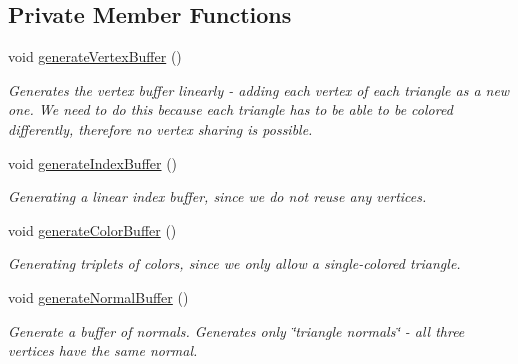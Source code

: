 \subsection*{Private Member Functions}
\begin{DoxyCompactItemize}
\item 
\mbox{\label{classpepr3d_1_1_geometry_a3c89c3e2f698d1cb25ad68767b90efc3}} 
void \mbox{\hyperlink{classpepr3d_1_1_geometry_a3c89c3e2f698d1cb25ad68767b90efc3}{generate\+Vertex\+Buffer}} ()
\begin{DoxyCompactList}\small\item\em Generates the vertex buffer linearly -\/ adding each vertex of each triangle as a new one. We need to do this because each triangle has to be able to be colored differently, therefore no vertex sharing is possible. \end{DoxyCompactList}\item 
\mbox{\label{classpepr3d_1_1_geometry_ac0ccbc4a83e4eeaa61fd3a7de4e0e7a9}} 
void \mbox{\hyperlink{classpepr3d_1_1_geometry_ac0ccbc4a83e4eeaa61fd3a7de4e0e7a9}{generate\+Index\+Buffer}} ()
\begin{DoxyCompactList}\small\item\em Generating a linear index buffer, since we do not reuse any vertices. \end{DoxyCompactList}\item 
\mbox{\label{classpepr3d_1_1_geometry_a93545e8dae1b2cfee74fbd8c7e203389}} 
void \mbox{\hyperlink{classpepr3d_1_1_geometry_a93545e8dae1b2cfee74fbd8c7e203389}{generate\+Color\+Buffer}} ()
\begin{DoxyCompactList}\small\item\em Generating triplets of colors, since we only allow a single-\/colored triangle. \end{DoxyCompactList}\item 
\mbox{\label{classpepr3d_1_1_geometry_a7d69aae6b0c09c7727d170af8b8b99b2}} 
void \mbox{\hyperlink{classpepr3d_1_1_geometry_a7d69aae6b0c09c7727d170af8b8b99b2}{generate\+Normal\+Buffer}} ()
\begin{DoxyCompactList}\small\item\em Generate a buffer of normals. Generates only \char`\"{}triangle normals\char`\"{} -\/ all three vertices have the same normal. \end{DoxyCompactList}\item 

\end{DoxyCompactItemize}
